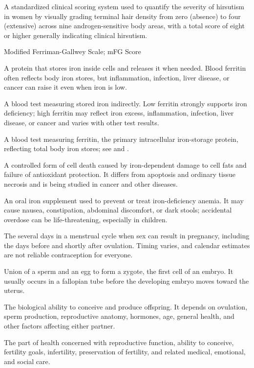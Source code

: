  A standardized clinical scoring system used to quantify the severity of hirsutism in women by visually grading terminal hair density from zero (absence) to four (extensive) across nine androgen-sensitive body areas, with a total score of eight or higher generally indicating clinical hirsutism.

\synonyms
Modified Ferriman-Gallwey Scale; mFG Score

 A protein that stores iron inside cells and releases it when needed. Blood ferritin often reflects body iron stores, but inflammation, infection, liver disease, or cancer can raise it even when iron is low.

 A blood test measuring stored iron indirectly. Low ferritin strongly supports iron deficiency; high ferritin may reflect iron excess, inflammation, infection, liver disease, or cancer and varies with other test results.

 A blood test measuring ferritin, the primary intracellular iron-storage protein, reflecting total body iron stores; see  and .

 A controlled form of cell death caused by iron-dependent damage to cell fats and failure of antioxidant protection. It differs from apoptosis and ordinary tissue necrosis and is being studied in cancer and other diseases.

 An oral iron supplement used to prevent or treat iron-deficiency anemia. It may cause nausea, constipation, abdominal discomfort, or dark stools; accidental overdose can be life-threatening, especially in children.

 The several days in a menstrual cycle when sex can result in pregnancy, including the days before and shortly after ovulation. Timing varies, and calendar estimates are not reliable contraception for everyone.

 Union of a sperm and an egg to form a zygote, the first cell of an embryo. It usually occurs in a fallopian tube before the developing embryo moves toward the uterus.

 The biological ability to conceive and produce offspring. It depends on ovulation, sperm production, reproductive anatomy, hormones, age, general health, and other factors affecting either partner.

 The part of health concerned with reproductive function, ability to conceive, fertility goals, infertility, preservation of fertility, and related medical, emotional, and social care.

